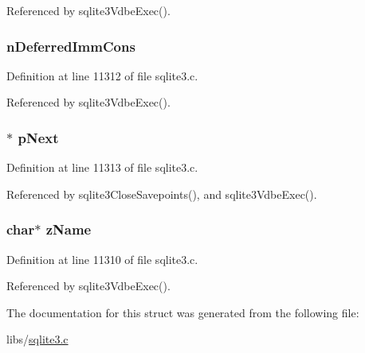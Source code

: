 Referenced by sqlite3\+Vdbe\+Exec().

\hypertarget{struct_savepoint_a786ba95eeafb385b1bd53e180a79ed20}{}
\subsubsection[{n\+Deferred\+Imm\+Cons}]{ n\+Deferred\+Imm\+Cons}\label{struct_savepoint_a786ba95eeafb385b1bd53e180a79ed20}


Definition at line 11312 of file sqlite3.\+c.



Referenced by sqlite3\+Vdbe\+Exec().

\hypertarget{struct_savepoint_a814ed4793adc9faf64ee3ddef77685a4}{}
\subsubsection[{p\+Next}]{$\ast$ p\+Next}\label{struct_savepoint_a814ed4793adc9faf64ee3ddef77685a4}


Definition at line 11313 of file sqlite3.\+c.



Referenced by sqlite3\+Close\+Savepoints(), and sqlite3\+Vdbe\+Exec().

\hypertarget{struct_savepoint_a661118d86ac4127d40bf3be78d92117d}{}
\subsubsection[{z\+Name}]{\setlength{\rightskip}{0pt plus 5cm}char$\ast$ z\+Name}\label{struct_savepoint_a661118d86ac4127d40bf3be78d92117d}


Definition at line 11310 of file sqlite3.\+c.



Referenced by sqlite3\+Vdbe\+Exec().



The documentation for this struct was generated from the following file\+:\begin{DoxyCompactItemize}
\item 
libs/\hyperlink{sqlite3_8c}{sqlite3.\+c}\end{DoxyCompactItemize}
